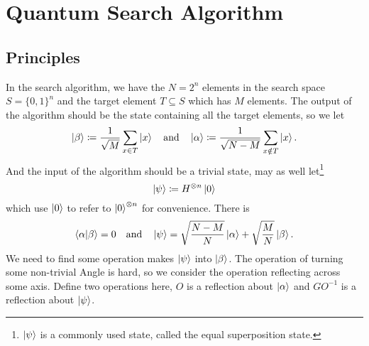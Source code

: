 \documentclass[a4paper,10pt]{article}
\numberwithin{equation}{subsection}
\begin{document}
\section{Quantum Search Algorithm}

\subsection{Principles}

In the search algorithm, we have the $N=2^{n}$ elements in the search space $S=\{0,1\}^{n}$ and the target element $T\subseteq S$ which has $M$ elements. The output of the algorithm should be the state containing all the target elements, so we let
\begin{equation}
    \ket{\beta}\coloneqq\frac{1}{\sqrt{M}}\sum_{x\in T}\ket{x}
    \quad\text{and}\quad
    \ket{\alpha}\coloneqq\frac{1}{\sqrt{N-M}}\sum_{x\notin T}\ket{x}.
\end{equation}
And the input of the algorithm should be a trivial state, may as well let\footnote{$\ket{\psi}$ is a commonly used state, called the equal superposition state.}
\begin{equation}
    \ket{\psi}\coloneqq H^{\otimes n}\ket{0}
\end{equation}
which use $\ket{0}$ to refer to $\ket{0}^{\otimes n}$ for convenience. There is
\begin{equation}
    \braket{\alpha|\beta}=0
    \quad\text{and}\quad
    \ket{\psi}=\sqrt{\frac{N-M}{N}}\ket{\alpha}+\sqrt{\frac{M}{N}}\ket{\beta}.
\end{equation}
We need to find some operation makes $\ket{\psi}$ into $\ket{\beta}$. The operation of turning some non-trivial Angle is hard, so we consider the operation reflecting across some axis. Define two operations here, $O$ is a reflection about $\ket{\alpha}$ and $GO^{-1}$ is a reflection about $\ket{\psi}$.
\begin{figure}[h]
    \centering
    \caption{}
    \label{fig:grover}
\end{figure}
\end{document}
